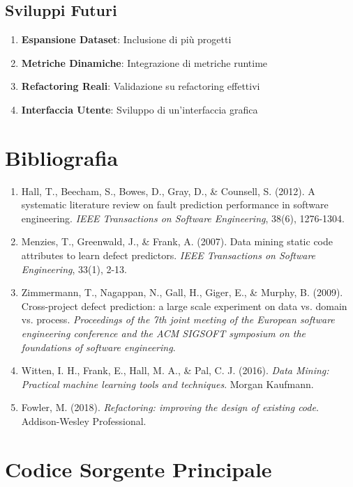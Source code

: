 \documentclass[12pt,a4paper]{article}
\begin{document}
\subsection{Sviluppi Futuri}

\begin{enumerate}
    \item \textbf{Espansione Dataset}: Inclusione di più progetti
    \item \textbf{Metriche Dinamiche}: Integrazione di metriche runtime
    \item \textbf{Refactoring Reali}: Validazione su refactoring effettivi
    \item \textbf{Interfaccia Utente}: Sviluppo di un'interfaccia grafica
\end{enumerate}

\section{Bibliografia}

\begin{enumerate}
    \item Hall, T., Beecham, S., Bowes, D., Gray, D., \& Counsell, S. (2012). A systematic literature review on fault prediction performance in software engineering. \textit{IEEE Transactions on Software Engineering}, 38(6), 1276-1304.
    \item Menzies, T., Greenwald, J., \& Frank, A. (2007). Data mining static code attributes to learn defect predictors. \textit{IEEE Transactions on Software Engineering}, 33(1), 2-13.
    \item Zimmermann, T., Nagappan, N., Gall, H., Giger, E., \& Murphy, B. (2009). Cross-project defect prediction: a large scale experiment on data vs. domain vs. process. \textit{Proceedings of the 7th joint meeting of the European software engineering conference and the ACM SIGSOFT symposium on the foundations of software engineering}.
    \item Witten, I. H., Frank, E., Hall, M. A., \& Pal, C. J. (2016). \textit{Data Mining: Practical machine learning tools and techniques}. Morgan Kaufmann.
    \item Fowler, M. (2018). \textit{Refactoring: improving the design of existing code}. Addison-Wesley Professional.
\end{enumerate}

\appendix

\section{Codice Sorgente Principale}
\end{document}
